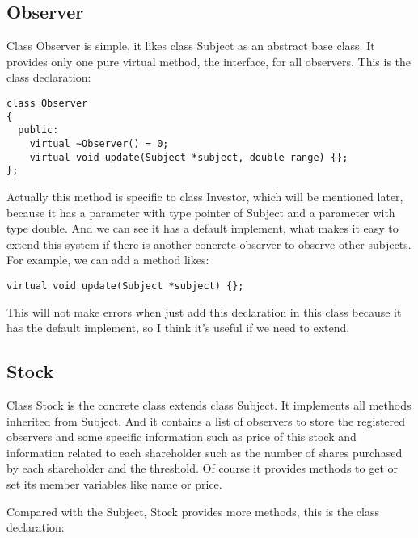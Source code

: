 \documentclass{article}
\begin{document}
\subsection{Observer}
    Class Observer is simple, it likes class Subject as an abstract base class. It provides only one pure virtual method, the interface, for all observers. This is the class declaration:
    
\begin{lstlisting}
class Observer
{
  public:
    virtual ~Observer() = 0;
    virtual void update(Subject *subject, double range) {};
};
\end{lstlisting}

    Actually this method is specific to class Investor, which will be mentioned later, because it has a parameter with type pointer of Subject and a parameter with type double. And we can see it has a default implement, what makes it easy to extend this system if there is another concrete observer to observe other subjects. For example, we can add a method likes:

\begin{lstlisting}
virtual void update(Subject *subject) {};
\end{lstlisting}

    This will not make errors when just add this declaration in this class because it has the default implement, so I think it's useful if we need to extend.

\subsection{Stock}
    Class Stock is the concrete class extends class Subject. It implements all methods inherited from Subject. And it contains a list of observers to store the registered observers and some specific information such as price of this stock and information related to each shareholder such as the number of shares purchased by each shareholder and the threshold. Of course it provides methods to get or set its member variables like name or price.
    
    Compared with the Subject, Stock provides more methods, this is the class declaration:
\end{document}
